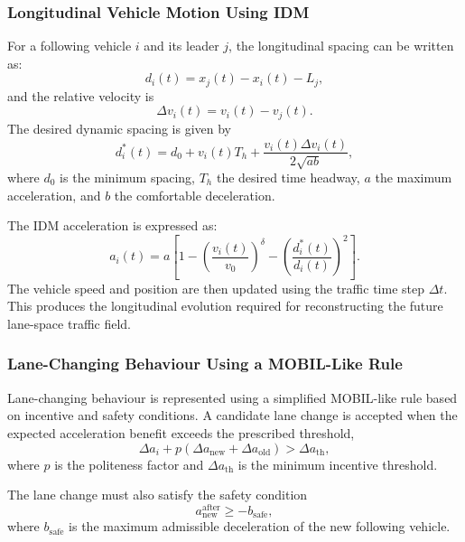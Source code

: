 \documentclass[journal]{IEEEtran}
\begin{document}
\subsubsection{Longitudinal Vehicle Motion Using IDM}

For a following vehicle $i$ and its leader $j$, the longitudinal spacing can be written as:
\begin{equation}
d_i(t) = x_j(t)-x_i(t)-L_j,
\end{equation}
and the relative velocity is
\begin{equation}
\Delta v_i(t) = v_i(t)-v_j(t).
\end{equation}
The desired dynamic spacing is given by
\begin{equation}
d_i^{*}(t) = d_0+v_i(t)T_h+\frac{v_i(t)\Delta v_i(t)}{2\sqrt{ab}},
\end{equation}
where $d_0$ is the minimum spacing, $T_h$ the desired time headway, $a$ the maximum acceleration, and $b$ the comfortable deceleration.

The IDM acceleration is expressed as:
\begin{equation}
a_i(t) = a\left[1-\left(\frac{v_i(t)}{v_0}\right)^{\delta}-\left(\frac{d_i^{*}(t)}{d_i(t)}\right)^2\right].
\end{equation}
The vehicle speed and position are then updated using the traffic time step $\Delta t$. This produces the longitudinal evolution required for reconstructing the future lane-space traffic field.

\subsubsection{Lane-Changing Behaviour Using a MOBIL-Like Rule}

Lane-changing behaviour is represented using a simplified MOBIL-like rule based on incentive and safety conditions. A candidate lane change is accepted when the expected acceleration benefit exceeds the prescribed threshold,
\begin{equation}
\Delta a_i+p\left(\Delta a_{\mathrm{new}}+\Delta a_{\mathrm{old}}\right)>\Delta a_{\mathrm{th}},
\end{equation}
where $p$ is the politeness factor and $\Delta a_{\mathrm{th}}$ is the minimum incentive threshold.

The lane change must also satisfy the safety condition
\begin{equation}
a_{\mathrm{new}}^{\mathrm{after}}\geq-b_{\mathrm{safe}},
\end{equation}
where $b_{\mathrm{safe}}$ is the maximum admissible deceleration of the new following vehicle.
\end{document}
